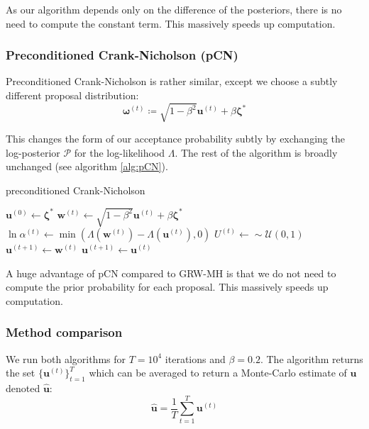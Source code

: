 \documentclass[]{article}
\newcommand{\loglik}{\Lambda}
\newcommand{\ubold}{\boldsymbol{u}}
\newcommand{\wbold}{\boldsymbol{w}}
\newcommand{\zetabold}{\boldsymbol{\zeta^*}}
\newcommand{\omegabold}{\boldsymbol{\omega}}
\newcommand{\Rho}{\mathcal{P}}
\begin{document}
As our algorithm depends only on the difference of the posteriors, there is no need to compute the constant term. This massively speeds up computation.

\subsubsection{Preconditioned Crank-Nicholson (pCN)}

Preconditioned Crank-Nicholson is rather similar, except we choose a subtly different proposal distribution:
%
\begin{equation}
	\omegabold^{(t)} \coloneqq \sqrt{1 - \beta^2} \ubold^{(t)} + \beta \zetabold
\end{equation}

This changes the form of our acceptance probability subtly by exchanging the log-posterior $\Rho$ for the log-likelihood $\loglik$. The rest of the algorithm is broadly unchanged (see algorithm \ref{alg:pCN}).
%
\begin{algorithm}
	\caption{preconditioned Crank-Nicholson}
	\label{alg:pCN}
	\begin{algorithmic}
		\State $\ubold^{(0)} \gets \zetabold$
		\State $\wbold^{(t)} \gets \sqrt{1 - \beta^2} \ubold^{(t)} + \beta \zetabold$ 
		\State $\ln \alpha^{(t)} \gets \min \left(\loglik(\wbold^{(t)}) - \loglik(\ubold^{(t)}), 0\right)$
		\State $U^{(t)} \gets \sim \mathcal{U}(0,1)$ \\
		\State $\ubold^{(t+1)} \gets \wbold^{(t)}$ 
		\Else
		\State $\ubold^{(t+1)} \gets \ubold^{(t)}$ 
		\EndIf
		\EndFor
	\end{algorithmic}
\end{algorithm}

A huge advantage of pCN compared to GRW-MH is that we do not need to compute the prior probability for each proposal. This massively speeds up computation.

\subsubsection{Method comparison}

We run both algorithms for $T=10^4$ iterations and $\beta=0.2$. The algorithm returns the set $\{ \ubold^{(t)} \}_{t=1}^{T}$ which can be averaged to return a Monte-Carlo estimate of $\ubold$ denoted $\hat{\ubold}$:
%
\begin{equation}
	\hat{\ubold} = \frac{1}{T} \sum_{t=1}^{T} \ubold^{(t)}
\end{equation}
\end{document}
